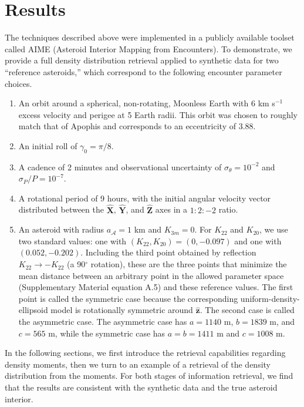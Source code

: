 \documentclass[fleqn,usenatbib]{mnras}
\newcommand{\unit}[1]{\bm{\hat{#1}}}
\begin{document}
\section{Results}
\label{sec:results}

The techniques described above were implemented in a publicly available toolset called AIME (Asteroid Interior Mapping from Encounters). To demonstrate, we provide a full density distribution retrieval applied to synthetic data for two ``reference asteroids,'' which correspond to the following encounter parameter choices.

\begin{enumerate}
  \item An orbit around a spherical, non-rotating, Moonless Earth with $6$ km s$^{-1}$ excess velocity and perigee at 5 Earth radii. This orbit was chosen to roughly match that of Apophis and corresponds to an eccentricity of 3.88. 
  \item An initial roll of $\gamma_0=\pi/8$.
  \item A cadence of 2 minutes and observational uncertainty of $\sigma_\theta = 10^{-2}$ and $\sigma_P / P = 10^{-7}$.
  \item A rotational period of 9 hours, with the initial angular velocity vector distributed between the $\unit X$, $\unit Y$, and $\unit Z$ axes in a $1:2:-2$ ratio.
  \item An asteroid with radius $a_\mathcal{A} = 1$ km and $K_{3m}=0$. For $K_{22}$ and $K_{20}$, we use two standard values: one with $(K_{22}, K_{20}) = (0, -0.097)$ and one with $(0.052, -0.202)$. Including the third point obtained by reflection $K_{22}\rightarrow -K_{22}$ (a 90$^\circ$ rotation), these are the three points that minimize the mean distance between an arbitrary point in the allowed parameter space (Supplementary Material equation A.5) and these reference values. The first point is called the symmetric case because the corresponding uniform-density-ellipsoid model is rotationally symmetric around $\unit z$. The second case is called the asymmetric case. The asymmetric case has $a=1140$ m, $b=1839$ m, and $c=565$ m, while the symmetric case has $a=b=1411$ m and $c=1008$ m.
\end{enumerate}

In the following sections, we first introduce the retrieval capabilities regarding density moments, then we turn to an example of a retrieval of the density distribution from the moments. For both stages of information retrieval, we find that the results are consistent with the synthetic data and the true asteroid interior.
\end{document}
